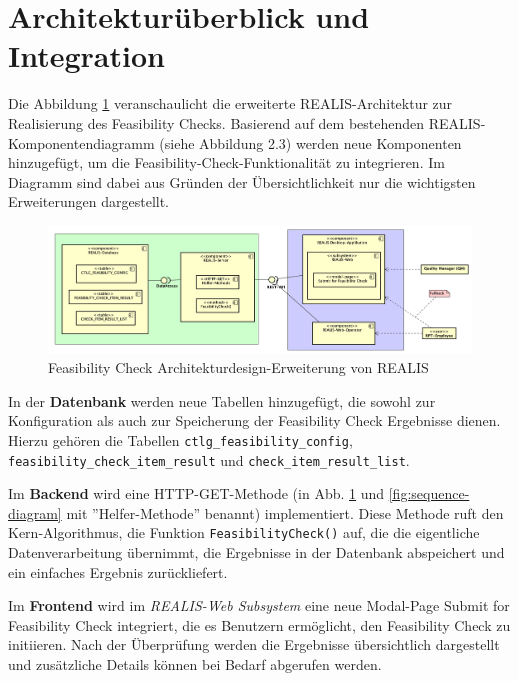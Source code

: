 \section{Architekturüberblick und Integration}

Die Abbildung \ref{fig:feasibility-check-komponentendiagramm} veranschaulicht die erweiterte REALIS-Architektur zur Realisierung des Feasibility Checks. Basierend auf dem bestehenden REALIS-Komponenten\-diagramm (siehe Abbildung 2.3) werden neue Komponenten hinzugefügt, um die Feasibility-Check-Funktionalität zu integrieren. Im Diagramm sind dabei aus Gründen der Übersichtlichkeit nur die wichtigsten Erweiterungen dargestellt.

\begin{figure}[!htbp]
    \centering
    \includegraphics[width=1\textwidth]{bilder/REALIS-Komponentendiagramm-mit-Erweiterungen.png}
    \caption{Feasibility Check Architekturdesign-Erweiterung von \gls{REALIS}}
    \label{fig:feasibility-check-komponentendiagramm}
\end{figure}



In der \textbf{Datenbank} werden neue Tabellen hinzugefügt, die sowohl zur Konfiguration als auch zur Speicherung der Feasibility Check Ergebnisse dienen. Hierzu gehören die Tabellen \texttt{ctlg\_feasibility\_config}, \texttt{feasibility\_check\_item\_result} und \texttt{check\_item\_\-result\_\-list}.

Im \textbf{Backend} wird eine HTTP-GET-Methode (in Abb. \ref{fig:feasibility-check-komponentendiagramm} und \ref{fig:sequence-diagram} mit ''Helfer-Methode'' benannt) implementiert. Diese Methode ruft den Kern-Algorithmus, die Funktion \texttt{FeasibilityCheck()} auf, die die eigentliche Datenverarbeitung übernimmt, die Ergebnisse in der Datenbank abspeichert und ein einfaches Ergebnis zurückliefert.

Im \textbf{Frontend} wird im \textit{REALIS-Web Subsystem} eine neue Modal-Page \glqq Submit for Feasibility Check\grqq{} integriert, die es Benutzern ermöglicht, den Feasibility Check zu initiieren. Nach der Überprüfung werden die Ergebnisse übersichtlich dargestellt und zusätzliche Details können bei Bedarf abgerufen werden. 

